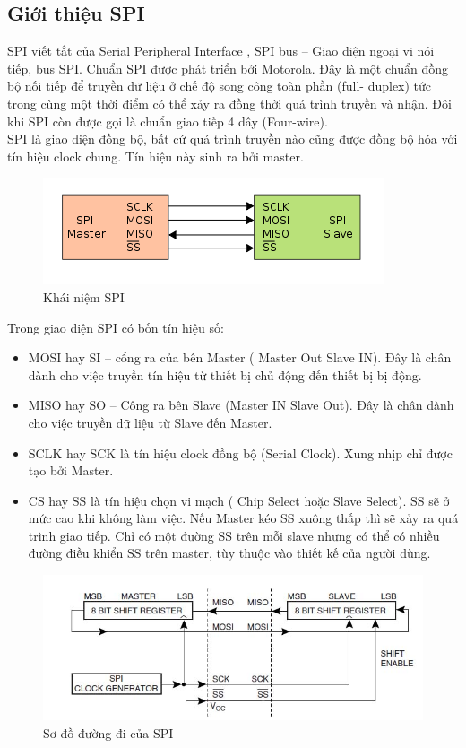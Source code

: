 \subsection{Giới thiệu SPI}
SPI viết tắt của Serial Peripheral Interface \cite{tl10}, SPI bus – Giao diện ngoại vi nói tiếp, bus SPI. Chuẩn SPI được phát triển bởi Motorola. Đây là một chuẩn đồng bộ nối tiếp để truyền dữ liệu ở chế độ song công toàn phần (full- duplex) tức trong cùng một thời điểm có thể xảy ra đồng thời quá trình truyền và nhận. Đôi khi SPI còn được gọi là chuẩn giao tiếp 4 dây (Four-wire).\\
SPI là giao diện đồng bộ, bất cứ quá trình truyền nào cũng được đồng bộ hóa với tín hiệu clock chung. Tín hiệu này sinh ra bởi master.\\
\begin{figure}[htp]
\begin{center}
\includegraphics[scale=1]{image5/khainiem.png}
\end{center}
\caption{Khái niệm SPI}
\end{figure}
Trong giao diện SPI có bốn tín hiệu số:
\begin{itemize}
\item MOSI hay SI – cổng ra của bên Master ( Master Out Slave IN). Đây là chân dành cho việc truyền tín hiệu từ thiết bị chủ động đến thiết bị bị động.
\item MISO hay SO – Công ra bên Slave (Master IN Slave Out). Đây là chân dành cho việc truyền dữ liệu từ Slave đến Master.
\item SCLK hay SCK là tín hiệu clock đồng bộ (Serial Clock). Xung nhịp chỉ được tạo bởi Master.
\item CS hay SS là tín hiệu chọn vi mạch ( Chip Select hoặc Slave Select). SS sẽ ở mức cao khi không làm việc. Nếu Master kéo SS xuông thấp thì sẽ xảy ra quá trình giao tiếp. Chỉ có một đường SS trên mỗi slave nhưng có thể có nhiều đường điều khiển SS trên master, tùy thuộc vào thiết kế của người dùng.
\end{itemize}
\begin{figure}[htp]
\begin{center}
\includegraphics[scale=0.6]{image5/nguyenly3.jpg}
\end{center}
\caption{Sơ đồ đường đi của SPI}
\end{figure}
\newpage
